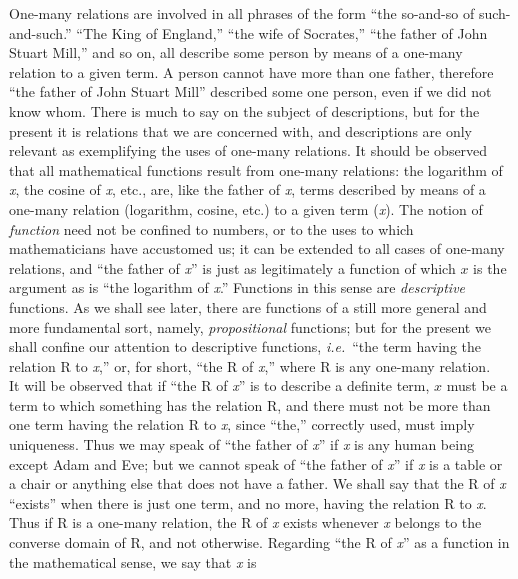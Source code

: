 {One-many relations are involved in all phrases of the
form
``the
so-and-so of such-and-such.'' ``The King of England,''   ``the wife of
Socrates,'' ``the father of John Stuart Mill,'' and so on, all describe
some person by means of a one-many relation to a given term. A person
cannot have more than one father, therefore ``the father of John Stuart
Mill'' described some one person, even if we did not know whom. There is
much to say on the subject of descriptions, but for the present it is
relations that we are concerned with, and descriptions are only
relevant as exemplifying the uses of one-many relations. It should be
observed that all mathematical functions result from one-many
relations: the logarithm of \textit{x},
the cosine of \textit{x},
etc., are, like the
father of \textit{x},
terms described by means of a one-many relation
(logarithm, cosine, etc.) to a given term (\textit{x}). The notion of \textit{function}
need not be confined to numbers, or to the uses to which mathematicians
have accustomed us; it can be extended to all cases of one-many
relations, and ``the father of \textit{x}''
is just as legitimately a function of
which $x$ is the argument as is ``the logarithm of \textit{x}.'' Functions in
this
sense are \textit{descriptive}
functions. As we shall see later, there are
functions of a still more general and more fundamental sort, namely,
\textit{propositional}
functions; but for the present we shall confine our
attention to descriptive functions, \textit{i.e.}\ ``the term
having the relation
R to \textit{x},''
or, for short, ``the R of \textit{x},''
where R is any one-many relation.\\
\indent It will be observed that if ``the R of \textit{x}'' is to describe a
definite
term, $x$ must be a term to which something has the relation R, and there
must not be more than one term having the relation R to \textit{x}, since ``the,''
correctly used, must imply uniqueness. Thus we may speak of ``the father
of \textit{x}'' if \textit{x} is any human
being
except
Adam and Eve; but we cannot speak of ``the father of \textit{x}'' if \textit{x} is a table
or a chair or anything else that does not have a father. We shall say
that the R of \textit{x}
``exists'' when there is just one term, and no more,
having the relation R to \textit{x}.
Thus if R is a one-many relation, the R of \textit{x} exists whenever
\textit{x}
belongs
to the converse domain of R, and not otherwise. Regarding ``the R of \textit{x}'' as a function in
the mathematical  
sense, we say
that \textit{x} is
}
